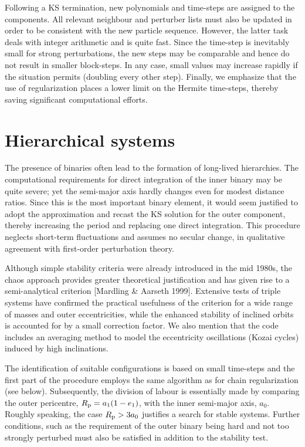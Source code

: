\documentclass[12pt]{article}
\begin{document}
Following a KS termination, new polynomials and time-steps are assigned to
the components.
All relevant neighbour and perturber lists must also be updated in order to
be consistent with the new particle sequence.
However, the latter task deals with integer arithmetic and is quite fast.
Since the \cm time-step is inevitably small for strong perturbations, the new
steps may be comparable and hence do not result in smaller block-steps.
In any case, small values may increase rapidly if the situation permits
(\ie doubling every other step).
Finally, we emphasize that the use of regularization places a lower limit on
the Hermite time-steps, thereby saving significant computational efforts.

\section{Hierarchical systems}

The presence of binaries often lead to the formation of long-lived
hierarchies.
The computational requirements for direct integration of the inner binary may
be quite severe; yet the semi-major axis hardly changes even for modest
distance ratios.
Since this is the most important binary element, it would seem justified to
adopt the \cm approximation and recast the KS solution for the outer
component, thereby increasing the period and replacing one direct
integration.
This procedure neglects short-term fluctuations and assumes no secular
change, in qualitative agreement with first-order perturbation theory.

Although simple stability criteria were already introduced in the mid 1980s,
the chaos approach provides greater theoretical justification and has given
rise to a semi-analytical criterion [Mardling \& Aarseth 1999].
Extensive tests of triple systems have confirmed the practical usefulness
of the criterion for a wide range of masses and outer eccentricities, while
the enhanced stability of inclined orbits is accounted for by a small
correction factor.
We also mention that the code {} includes an averaging method
to model the eccentricity oscillations (Kozai cycles) induced by high
inclinations.

The identification of suitable configurations is based on small \cm
time-steps and the first part of the procedure employs the same algorithm
as for chain regularization (see below).
Subsequently, the division of labour is essentially made by comparing the
outer pericentre, $R_{\rm p} = a_1 (1 - e_1)$, with the inner semi-major
axis, $a_0$.
Roughly speaking, the case $R_{\rm p} > 3 a_0$ justifies a search for stable
systems.
Further conditions, such as the requirement of the outer binary being hard
and not too strongly perturbed must also be satisfied in addition to the
stability test.
\end{document}
